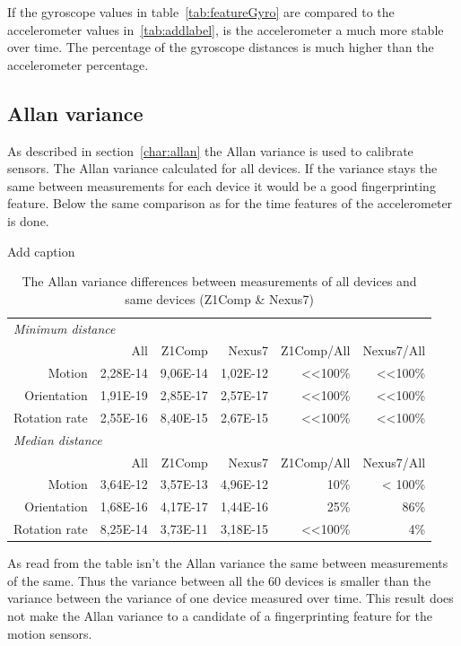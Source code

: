 If the gyroscope values in table~\ref{tab:featureGyro} are compared to the accelerometer values in~\ref{tab:addlabel}, is the accelerometer a much more stable over time. The percentage of the gyroscope distances is much higher than the accelerometer percentage.


\subsection{Allan variance}
As described in section~\ref{char:allan} the Allan variance is used to calibrate sensors. The Allan variance calculated for all devices. If the variance stays the same between measurements for each device it would be a good fingerprinting feature. Below the same comparison as for the time features of the accelerometer is done.
\begin{table}[htbp]
  \centering
  \caption{Add caption}
    \begin{tabular}{rrrrrr}
    \toprule
    \multicolumn{6}{l}{\textit{Minimum distance}} \\
          & All   & Z1Comp & Nexus7 & Z1Comp/All & Nexus7/All \\
          \midrule
    Motion & 2,28E-14 & 9,06E-14 & 1,02E-12 & <<100\% & <<100\% \\
    Orientation & 1,91E-19 & 2,85E-17 & 2,57E-17 & <<100\% & <<100\% \\
    Rotation rate & 2,55E-16 & 8,40E-15 & 2,67E-15 & <<100\% & <<100\% \\
    \toprule
    \multicolumn{6}{l}{\textit{Median distance}} \\
          & All   & Z1Comp & Nexus7 & Z1Comp/All & Nexus7/All \\
          \midrule
    Motion & 3,64E-12 & 3,57E-13 & 4,96E-12 & 10\%  & < 100\% \\
    Orientation & 1,68E-16 & 4,17E-17 & 1,44E-16 & 25\%  & 86\% \\
    Rotation rate & 8,25E-14 & 3,73E-11 & 3,18E-15 & <<100\% & 4\% \\
    \bottomrule
    \end{tabular}%
    \caption{The Allan variance differences between measurements of all devices and same devices (Z1Comp \& Nexus7)}
  \label{tab:allan}%
\end{table}%
As read from the table isn't the Allan variance the same between measurements of the same. Thus the variance between all the 60 devices is smaller than the variance between the variance of one device measured over time. This result does not make the Allan variance to a candidate of a fingerprinting feature for the motion sensors.  


